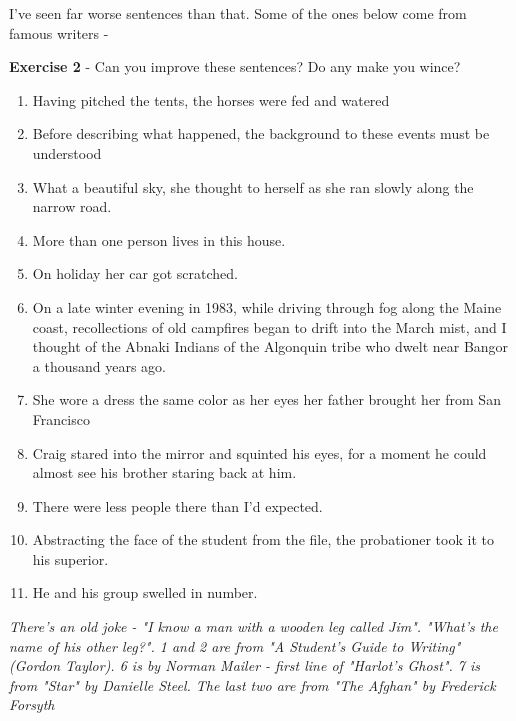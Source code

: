 \documentclass[11pt]{article}
\newenvironment{narrow}[2]{%
 \begin{list}{}{%
  \setlength{\topsep}{0pt}%
  \setlength{\leftmargin}{#1}%
  \setlength{\rightmargin}{#2}%
  \setlength{\listparindent}{\parindent}%
  \setlength{\itemindent}{\parindent}%
  \setlength{\parsep}{\parskip}%
 }%
\item[]}{\end{list}}
\begin{document}
I've seen far worse sentences than that. Some of the ones below come from famous writers -



\begin{narrow}{1.0cm}{1.0cm}
\textbf{Exercise 2} - Can you improve these sentences? Do any make you wince?
\end{narrow}

\begin{enumerate}
\item Having pitched the tents, the horses were fed and watered
\item Before describing what happened, the background to these events must be understood
\item  What a beautiful sky, she thought to herself as she ran slowly along the narrow road.

\item  More than one person lives in this house.

\item  On holiday her car got scratched.

\item  On a late winter evening in 1983, while driving through fog along the Maine coast, recollections of old campfires began to drift into the March mist, and I thought of the Abnaki Indians of the Algonquin tribe who dwelt near Bangor a thousand years ago. 

\item  She wore a dress the same color as her eyes her father brought her from San Francisco

\item  Craig stared into the mirror and squinted his eyes, for a moment he could almost see his brother staring back at him.

\item  There were less people there than I'd expected.


\item  Abstracting the face of the student from the file, the probationer took it to his superior.

\item  He and his group swelled in number.
\end{enumerate}
\textit{
There's an old joke - "I know a man with a wooden leg called Jim". "What's the name of his other leg?". 1 and 2 are from "A Student's Guide to Writing" (Gordon Taylor). 6 is by Norman Mailer -  first line of "Harlot's Ghost". 7 is from "Star" by Danielle Steel. The last two are from "The Afghan" by Frederick Forsyth
}
\end{document}
